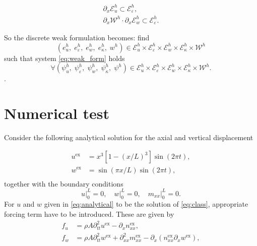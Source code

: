 \documentclass{ifacconf}
\begin{document}
\begin{equation}
\begin{aligned}
	\partial_x \mathcal{E}^h_u \subset \mathcal{E}^h_\varepsilon, \\
	\partial_x \mathcal{W}^h \cdot  \partial_x \mathcal{E}^h_w \subset \mathcal{E}^h_\varepsilon.
\end{aligned}
\end{equation}

So the discrete weak formulation becomes: find 
$$(e_u^h, \; e_\varepsilon^h, \; e_w^h, \; e_\kappa^h, \; w^h) \in   \mathcal{E}^h_u \times \mathcal{E}^h_\varepsilon \times \mathcal{E}^h_w \times \mathcal{E}^h_\kappa \times \mathcal{W}^h$$
such that system \eqref{eq:weak_form} holds 
$$\forall (\psi_u^h, \; \psi_\varepsilon^h, \;  \psi_w^h, \; \psi_\kappa^h, \; \psi^h) \in \mathcal{E}^h_u \times \mathcal{E}^h_\varepsilon \times \mathcal{E}^h_w \times \mathcal{E}^h_\kappa \times \mathcal{W}^h.$$.

\section{Numerical test}\label{sec:num_test}

Consider the following analytical solution for the axial and vertical displacement

\begin{equation}\label{eq:analytical}
	\begin{aligned}
		u^{\text{ex}} &= x^3[1-(x/L)^3] \sin(2 \pi t), \\
		w^{\text{ex}} &= \sin(\pi x/L)\sin(2 \pi t), \\
	\end{aligned}
\end{equation}
together with the boundary conditions
\begin{equation}
u\vert_0^L = 0, \quad w\vert_0^L =0, \quad m_{xx}\vert_{0}^L=0.
\end{equation}
For $u$ and $w$ given in \eqref{eq:analytical} to be the solution of \eqref{eq:class}, appropriate forcing term have to be introduced. These are given by 
\begin{equation}\label{eq:forcing}
	\begin{aligned}
		f_u &= \rho A \partial_{tt}^2 u^{\text{ex}} - \partial_x n_{xx}^{\text{ex}}, \\
		f_w &= \rho A \partial_{tt}^2 w^{\text{ex}} + \partial_{xx}^2 m_{xx}^{\text{ex}} - \partial_x(n_{xx}^{\text{ex}} \partial_x w^{\text{ex}}), \\
	\end{aligned}
\end{equation}
\end{document}

